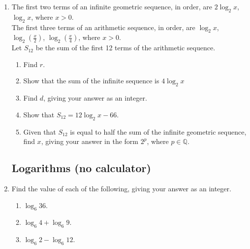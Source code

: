 \documentclass[12pt, oneside]{article}
\begin{document}
\begin{enumerate}
\item The first two terms of an infinite geometric sequence, in order, are $2 \log_2{x}$, $\log_2{x}$, where $x>0$.\\
The first three terms of an arithmetic sequence, in order, are $\log_2{x}$, $\log_2{\left(\frac{x}{2}\right)}$, $\log_2{\left(\frac{x}{4}\right)}$, where $x>0$.\\
Let $S_{12}$ be the sum of the first 12 terms of the arithmetic sequence.
\begin{enumerate}
    \item Find $r$.
        \begin{flushright}[2]\end{flushright}
    \item Show that the sum of the infinite sequence is $4 \log_2{x}$
        \begin{flushright}[2]\end{flushright}
    \item Find $d$, giving your answer as an integer.
        \begin{flushright}[4]\end{flushright}
    \item Show that $S_{12}=12 \log_2 x -66$.
        \begin{flushright}[2]\end{flushright}
    \item Given that $S_{12}$ is equal to half the sum of the infinite geometric sequence, find $x$, giving your answer in the form $2^p$, where $p \in \mathbb{Q}$.
        \begin{flushright}[5]\end{flushright}
    \end{enumerate}

\subsection*{Logarithms (no calculator)}

\item Find the value of each of the following, giving your answer as an integer.
\begin{enumerate}
    \item $\log_6 36$.
        \begin{flushright}[2]\end{flushright}
    \item $\log_6 4 + \log_6 9$.
        \begin{flushright}[2]\end{flushright}
    \item $\log_6 2 - \log_6 12$.
        \begin{flushright}[3]\end{flushright}
\end{enumerate}


\end{enumerate}
\end{document}
